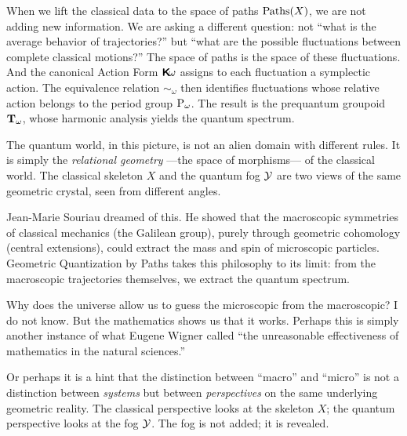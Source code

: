 \documentclass[10pt,reqno,letterpaper,twoside]{amsbook}
\begin{document}
  When we lift the classical data to the space of paths $\operatorname{Paths}(X)$,
  we are not adding new information.
  We are asking a different question:
  not ``what is the average behavior of trajectories?''
  but ``what are the possible fluctuations between complete classical motions?''
  The space of paths is the space of these fluctuations.
  And the canonical Action Form $\boldsymbol{\mathsf{K}}\!\omega$ assigns to each fluctuation
  a symplectic action.
  The equivalence relation $\sim_\omega$ then identifies fluctuations
  whose relative action belongs to the period group $\operatorname{P}_\omega$.
  The result is the prequantum groupoid ${\mathbf T}_\omega$,
  whose harmonic analysis yields the quantum spectrum.
  
  The quantum world,
  in this picture,
  is not an alien domain with different rules.
  It is simply the \emph{relational geometry}
  ---the space of morphisms---
  of the classical world.
  The classical skeleton $X$ and the quantum fog $\mathcal{Y}$
  are two views of the same geometric crystal,
  seen from different angles.
  
  Jean-Marie Souriau dreamed of this.
  He showed that the macroscopic symmetries of classical mechanics
  (the Galilean group),
  purely through geometric cohomology
  (central extensions),
  could extract the mass and spin of microscopic particles.
  Geometric Quantization by Paths takes this philosophy to its limit:
  from the macroscopic trajectories themselves,
  we extract the quantum spectrum.
  
  Why does the universe allow us to guess the microscopic
  from the macroscopic?
  I do not know.
  But the mathematics shows us that it works.
  Perhaps this is simply another instance
  of what Eugene Wigner called
  ``the unreasonable effectiveness of mathematics
  in the natural sciences.''
  
  Or perhaps it is a hint
  that the distinction between ``macro'' and ``micro''
  is not a distinction between \emph{systems}
  but between \emph{perspectives}
  on the same underlying geometric reality.
  The classical perspective looks at the skeleton $X$;
  the quantum perspective looks at the fog $\mathcal{Y}$.
  The fog is not added;
  it is revealed.
  
  
  
  
\end{document}

